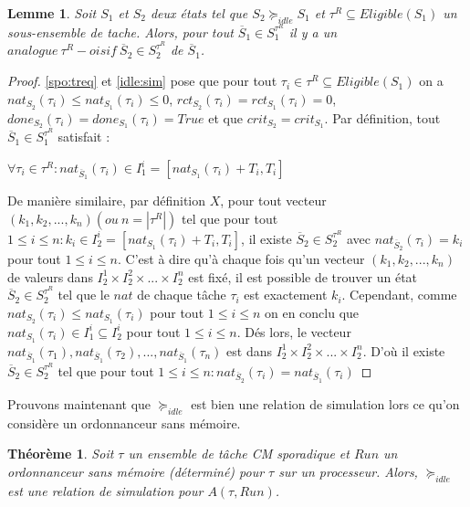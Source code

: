 \documentclass[12pt,a4paper,oneside]{book}
\theoremstyle{break}
\theoremstyle{breakplain}
\newtheorem{theo}{Théorème}[chapter]
\newtheorem{lem}{Lemme}[chapter]
\begin{document}
\begin{lem}
\label{reqanalogueeq}
Soit $S_1$ et $S_2$ deux états tel que $S_2 \succeq_{idle} S_1$ et $\tau^R \subseteq Eligible(S_1)$ un sous-ensemble de tache. Alors, pour tout $\overline{S}_1 \in S_1^{\tau^R}$ il y a un $analogue\ \tau^R-oisif\ \overline{S}_2 \in S_2^{\tau^R}$ de $\overline{S}_1$.
\end{lem}
\begin{proof}
\autoref{spo:treq} et \autoref{idle:sim} pose que pour tout $\tau_i \in \tau^R \subseteq Eligible(S_1)$ on a $nat_{S_2}(\tau_i) \leq nat_{S_1}(\tau_i) \leq 0$, $rct_{S_2}(\tau_i) = rct_{S_1}(\tau_i) = 0$, $done_{S_2}(\tau_i) = done_{S_1}(\tau_i) = True$ et que $crit_{S_2} = crit_{S_1}$. Par définition, tout $\overline{S}_1 \in S^{\tau^R}_1$ satisfait :
\begin{center}
$\forall \tau_i \in \tau^R : nat_{\overline{S}_1}(\tau_i) \in I^i_1=[nat_{S_1}(\tau_i)+T_i, T_i] $
\end{center}
De manière similaire, par définition $X$, pour tout vecteur $(k_1, k_2, ..., k_n)(ou\ n = |\tau^R|)$ tel que pour tout $1\leq i \leq n: k_i \in I^i_2=[nat_{S_1}(\tau_i)+T_i, T_i]$, il existe $\overline{S}_2\in S^{\tau^R}_2$ avec $nat_{\overline{S}_2}(\tau_i) = k_i$ pour tout $1\leq i \leq n$. C'est à dire qu'à chaque fois qu'un vecteur $(k_1, k_2, ..., k_n)$ de valeurs dans $I_2^1 \times I_2^2 \times ... \times I_2^n$ est fixé, il est possible de trouver un état $\overline{S}_2 \in S^{\tau^R}_2$ tel que le $nat$ de chaque tâche $\tau_i$ est exactement $k_i$. Cependant, comme $nat_{S_2}(\tau_i) \leq nat_{S_1}(\tau_i)$ pour tout $1\leq i \leq n$ on en conclu que $nat_{S_1}(\tau_i) \in I^i_1 \subseteq I^i_2$ pour tout $1\leq i \leq n$. Dés lors, le vecteur $nat_{\overline{S}_1}(\tau_1), nat_{\overline{S}_1}(\tau_2), ..., nat_{\overline{S}_1}(\tau_n)$ est dans $I_2^1 \times I_2^2 \times ... \times I_2^n$. D'où il existe $\overline{S}_2 \in S^{\tau^R}_2$ tel que pour tout $1\leq i \leq n : nat_{\overline{S}_2}(\tau_i) = nat_{\overline{S}_1}(\tau_i)$
\end{proof}


Prouvons maintenant que $\succeq_{idle}$ est bien une relation de simulation lors ce qu'on considère un ordonnanceur sans mémoire.

\begin{theo}
Soit $\tau$ un ensemble de tâche CM sporadique et $Run$ un ordonnanceur sans mémoire (déterminé) pour $\tau$ sur un processeur. Alors, $\succeq_{idle}$ est une relation de simulation pour $A(\tau, Run)$.
\end{theo}
\end{document}
